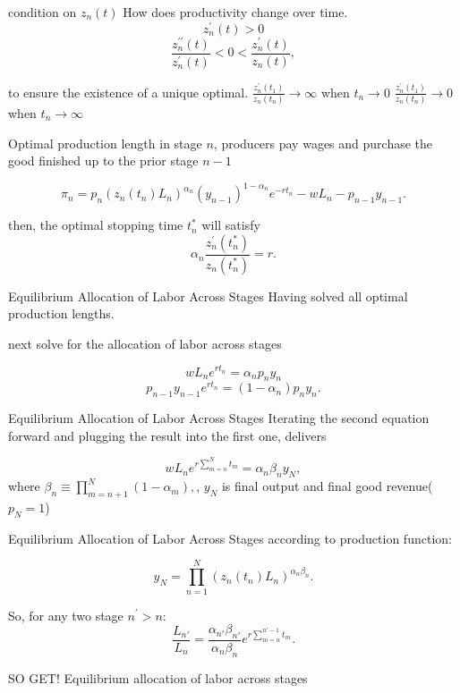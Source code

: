 \documentclass[aspectratio=1610]{beamer}
\begin{document}
\begin{frame}{condition on $z_n(t)$}
\Large
How does productivity change over time.
    $$z_{n}^{\prime}(t) > 0$$
    $$\frac{z_{n}^{\prime\prime}(t)}{z_{n}^{\prime}(t)} < 0 < \frac{z_{n}^{\prime}(t)}{z_{n}(t)},$$
    \vspace{1cm}

to ensure the existence of a unique optimal.
$\frac{z_{n}^{\prime}(t_{1})}{z_{n}(t_{n})} \rightarrow \infty$ when $t_n \rightarrow 0$
$\frac{z_{n}^{\prime}(t_{1})}{z_{n}(t_{n})} \rightarrow 0$ when $t_n \rightarrow \infty$
\end{frame}

\begin{frame}{Optimal production length}
\Large
in stage $n$, producers pay wages and purchase the good finished up to the prior stage $n-1$

\vspace{1cm}

$$\pi_{n} = p_{n}\left(z_{n}(t_{n})L_{n}\right)^{\alpha_{n}}\left(y_{n-1}\right)^{1-\alpha_{n}}e^{-rt_{n}} - wL_{n} - p_{n-1}y_{n-1}.$$

\vspace{1cm}
then, the optimal stopping time $t^\ast_n$ will satisfy
$$\alpha_{n}\frac{z_{n}^{\prime}(t_{n}^{*})}{z_{n}(t_{n}^{*})} = r.$$
    
\end{frame}

\begin{frame}{Equilibrium Allocation of Labor Across Stages}
\Large 
Having solved all optimal production  lengths.

\vspace{1cm}

next solve for the allocation of labor across stages

    $$wL_{n}e^{rt_{n}} = \alpha_{n}p_{n}y_{n}$$
    $$p_{n-1}y_{n-1}e^{rt_{n}} = (1-\alpha_{n})p_{n}y_{n}.$$
\end{frame}


\begin{frame}{Equilibrium Allocation of Labor Across Stages}
\Large 
Iterating the second equation forward and plugging the result into the first one, delivers

$$wL_{n}e^{r\sum\limits_{m=n}^{N}t_{m}} = \alpha_{n}\beta_{n}y_{N},$$
where $\beta_{n} \equiv \prod_{m=n+1}^{N}\left(1-\alpha_{m}\right),$, $y_N$ is final output and final good revenue($p_N=1$)
\end{frame}

\begin{frame}{Equilibrium Allocation of Labor Across Stages}
according to production function:

$$y_{N} = \prod_{n=1}^{N}\left(z_{n}(t_{n})L_{n}\right)^{\alpha_{n}\beta_{n}}.$$

\vspace{1cm}
So, for any two stage $n^\prime>n $:
$$\frac{L_{n'}}{L_{n}} = \frac{\alpha_{n'}\beta_{n'}}{\alpha_{n}\beta_{n}}e^{r\sum\limits_{m=n}^{n'-1}t_{m}}.$$

\vspace{1cm}
SO GET!  Equilibrium allocation of labor across stages
\end{frame}
\end{document}
